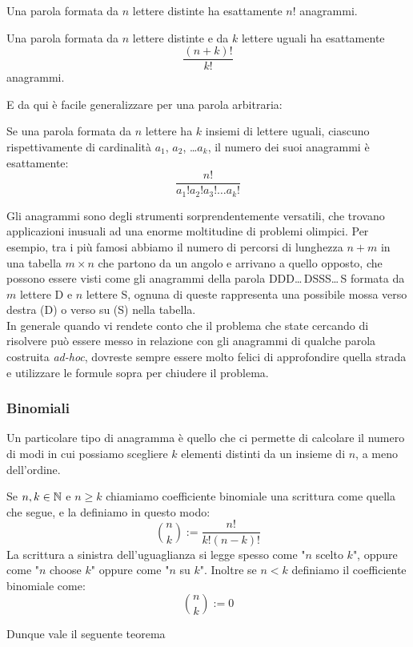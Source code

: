 \documentclass[11pt]{scrartcl}
\begin{document}
	\begin{theorem}
		\label{anag:1}
		Una parola formata da $n$ lettere distinte ha esattamente $n!$ anagrammi.
	\end{theorem}
	\begin{theorem}
		\label{anag:2}
		Una parola formata da $n$ lettere distinte e da $k$ lettere uguali ha esattamente
		$$\frac{(n+k)!}{k!}$$
		anagrammi.
	\end{theorem}
	E da qui è facile generalizzare per una parola arbitraria:
	\begin{theorem}
		\label{anag:3}
		Se una parola formata da $n$ lettere ha $k$ insiemi di lettere uguali, ciascuno rispettivamente di cardinalità $a_1$, $a_2$, \dots $a_k$, il numero dei suoi anagrammi è esattamente:
		$$\frac{n!}{a_1!a_2!a_3!\dots a_k!}$$
	\end{theorem}
	Gli anagrammi sono degli strumenti sorprendentemente versatili, che trovano applicazioni inusuali ad una enorme moltitudine di problemi olimpici. Per esempio, tra i più famosi abbiamo il numero di percorsi di lunghezza $n+m$ in una tabella $m\times n$ che partono da un angolo e arrivano a quello opposto, che possono essere visti come gli anagrammi della parola DDD\dots\,DSSS\dots\,S formata da $m$ lettere D e $n$ lettere S, ognuna di queste rappresenta una possibile mossa verso destra (D) o verso su (S) nella tabella. 
	\\
	In generale quando vi rendete conto che il problema che state cercando di risolvere può essere messo in relazione con gli anagrammi di qualche parola costruita \textit{ad-hoc}, dovreste sempre essere molto felici di approfondire quella strada e utilizzare le formule sopra per chiudere il problema.
	
	\subsubsection{Binomiali}
	
	Un particolare tipo di anagramma è quello che ci permette di calcolare il numero di modi in cui possiamo scegliere $k$ elementi distinti da un insieme di $n$, a meno dell'ordine.
	\begin{definition}
		\label{binomial}
		Se $n,k\in\mathbb N$ e $n\ge k$ chiamiamo coefficiente binomiale una scrittura come quella che segue, e la definiamo in questo modo:
		$$\binom{n}{k}:=\frac{n!}{k!(n-k)!}$$
		La scrittura a sinistra dell'uguaglianza si legge spesso come "$n$ scelto $k$", oppure come "$n$ choose $k$" oppure come "$n$ su $k$". Inoltre se $n<k$ definiamo il coefficiente binomiale come:
		$$\binom{n}{k}:=0$$
	\end{definition}
	Dunque vale il seguente teorema
	
\end{document}
